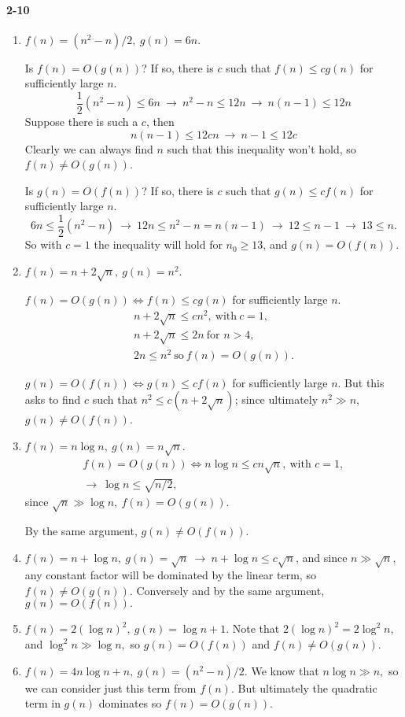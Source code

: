 \documentclass{report}
\begin{document}
\paragraph{2-10}
\begin{enumerate}[label=(\alph*)]
	\item $f(n) = (n^2 - n)/2,\ g(n) = 6n.$

		Is $f(n) = O(g(n))$? If so, there is $c$ such that $f(n) \le cg(n)$ for sufficiently large $n$.
		\[
			\frac{1}{2}\left(n^2 - n\right) \le 6n
				\ \to\ n^2 - n \le 12n
				\ \to\ n(n-1) \le 12n
		\]
		Suppose there is such a $c$, then
		\[
			n(n-1) \le 12cn\ \to\ n-1 \le 12c
		\]
		Clearly we can always find $n$ such that this inequality won't hold, so $f(n) \ne O(g(n))$.

		Is $g(n) = O(f(n))$? If so, there is $c$ such that $g(n) \le cf(n)$ for sufficiently large $n$.
		\[
			6n \le \frac{1}{2}\left(n^2 - n\right)
			\ \to\ 12n \le n^2 - n = n(n-1)
			\ \to\ 12 \le n - 1
			\ \to\ 13 \le n.
		\]
		So with $c = 1$ the inequality will hold for $n_0 \ge 13$, and $g(n) = O(f(n))$.

	\item $f(n) = n + 2\sqrt{n},\ g(n) = n^2.$

		$f(n) = O(g(n)) \iff f(n) \le cg(n)$ for sufficiently large $n$.
		\begin{gather*}
			n + 2\sqrt{n} \le cn^2,\ \text{with}\ c = 1, \\
			n + 2\sqrt{n} \le 2n\ \text{for $n > 4$}, \\
			2n \le n^2\ \text{so}\ f(n) = O(g(n)).
		\end{gather*}

		$g(n) = O(f(n)) \iff g(n) \le cf(n)$ for sufficiently large $n$. But this asks to find $c$ such that $n^2 \le c\left(n + 2\sqrt{n}\right)$; since ultimately $n^2 \gg n$, $g(n) \ne O(f(n))$.

	\item $f(n) = n\log n,\ g(n) = n\sqrt{n}.$
		\begin{gather*}
			f(n) = O(g(n)) \iff n\log n \le cn\sqrt{n},\ \text{with $c=1,$} \\
			\to\ \log n \le \sqrt{n/2},
		\end{gather*}
		since $\sqrt{n} \gg \log n,\ f(n) = O(g(n)).$

		By the same argument, $g(n) \ne O(f(n)).$

	\item $f(n) = n + \log n,\ g(n) = \sqrt{n}\ \to\ n + \log n \le c\sqrt{n}$, and since $n \gg \sqrt{n}$, any constant factor will be dominated by the linear term, so $f(n) \ne O(g(n)).$ Conversely and by the same argument, $g(n) = O(f(n)).$

	\item $f(n) = 2\left(\log n\right)^2,\ g(n) = \log n + 1.$ Note that $2\left(\log n\right)^2 = 2\log^2 n$, and $\log^2 n \gg \log n,$ so $g(n) = O(f(n))$ and $f(n) \ne O(g(n)).$

	\item $f(n) = 4n\log n + n,\ g(n) = \left(n^2 - n\right)/2.$ We know that $n\log n \gg n,$ so we can consider just this term from $f(n).$ But ultimately the quadratic term in $g(n)$ dominates so $f(n) = O(g(n)).$
\end{enumerate}
\end{document}
